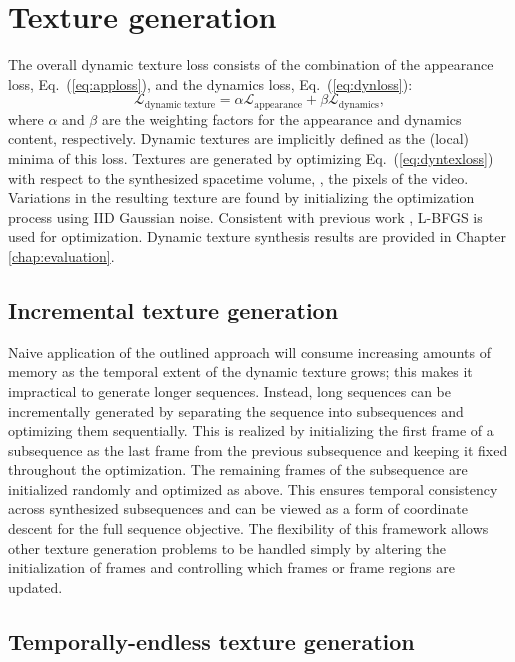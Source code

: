\section{Texture generation}\label{sec:texgen}
The overall dynamic texture loss consists of the combination of the appearance loss, Eq.\ (\ref{eq:apploss}),
and the dynamics loss, Eq.\ (\ref{eq:dynloss}):
\begin{equation}
   \mathcal{L}_\text{dynamic texture} = \alpha\mathcal{L}_\text{appearance} + \beta \mathcal{L}_\text{dynamics}, \label{eq:dyntexloss}
\end{equation}
where $\alpha$ and $\beta$ are the weighting factors for the
appearance and dynamics content, respectively.
Dynamic textures are implicitly defined as the (local) minima 
of this loss.
Textures are generated by optimizing Eq.\ 
(\ref{eq:dyntexloss}) with respect to the synthesized spacetime volume,
\ie, the pixels of the video.
Variations in the resulting texture are found by initializing the
optimization process using IID Gaussian noise.
Consistent with previous work \cite{gatys2015}, L-BFGS \cite{liu1989} is used for optimization. Dynamic texture synthesis results are provided in Chapter \ref{chap:evaluation}.

\subsection{Incremental texture generation}

Naive application of the outlined approach will consume
increasing amounts of memory as the temporal extent of the 
dynamic texture grows; this makes it impractical to generate
longer sequences.
Instead, long sequences can be incrementally generated by
separating the sequence into subsequences and optimizing them 
sequentially.  This is realized by initializing the first frame of a subsequence as the last 
frame from the previous subsequence and keeping it fixed throughout
the optimization.
The remaining frames of the subsequence are initialized randomly and
optimized as above.
This ensures temporal consistency across synthesized subsequences
and can be viewed as a form of coordinate descent for the full
sequence objective.
The flexibility of this framework allows other texture generation
problems to be handled simply by altering the 
initialization of frames and controlling which
frames or frame regions are updated. 

\subsection{Temporally-endless texture generation}

